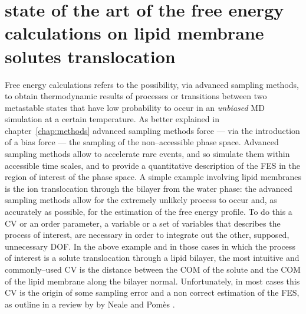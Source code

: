 \section{state of the art of the free energy calculations on lipid membrane solutes translocation}
Free energy calculations refers to the possibility, via advanced sampling methods, to obtain thermodynamic results of processes or transitions between two metastable states that have low probability to occur in an \textit{unbiased} \ac{MD} simulation at a certain temperature. As better explained in chapter~\ref{chap:methods} advanced sampling methods force --- via the introduction of a bias force --- the sampling of the non--accessible phase space. Advanced sampling methods allow to accelerate rare events, and so simulate them within accessible time scales, and to provide a quantitative description of the \ac{FES} in the region of interest of the phase space. A simple example involving lipid membranes is the ion translocation through the bilayer from the water phase: the advanced sampling methods allow for the extremely unlikely process to occur and, as accurately as possible, for the estimation of the free energy profile. To do this a \ac{CV} or an order parameter, a variable or a set of variables that describes the process of interest, are necessary in order to integrate out the other, supposed, unnecessary \ac{DOF}. In the above example and in those cases in which the process of interest is a solute translocation through a lipid bilayer, the most intuitive and commonly--used \ac{CV} is the distance between the \ac{COM} of the solute and the \ac{COM} of the lipid membrane along the bilayer normal. Unfortunately, in most cases this \ac{CV} is the origin of some sampling error and a non correct estimation of the \ac{FES}, as outline in a review by by Neale and Pomès \cite{Neale2016}.


